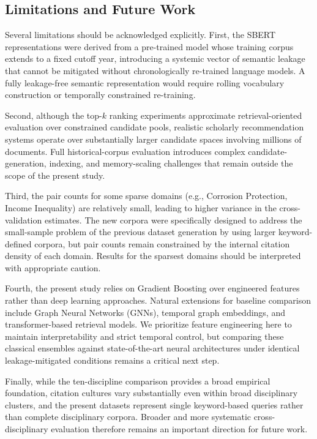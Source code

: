 \documentclass[11pt,a4paper]{article}
\begin{document}
\subsection{Limitations and Future Work}

Several limitations should be acknowledged explicitly. First, the SBERT representations were derived from a pre-trained model whose training corpus extends to a fixed cutoff year, introducing a systemic vector of semantic leakage that cannot be mitigated without chronologically re-trained language models. A fully leakage-free semantic representation would require rolling vocabulary construction or temporally constrained re-training.

Second, although the top-\(k\) ranking experiments approximate retrieval-oriented evaluation over constrained candidate pools, realistic scholarly recommendation systems operate over substantially larger candidate spaces involving millions of documents. Full historical-corpus evaluation introduces complex candidate-generation, indexing, and memory-scaling challenges that remain outside the scope of the present study.

Third, the pair counts for some sparse domains (e.g., Corrosion Protection, Income Inequality) are relatively small, leading to higher variance in the cross-validation estimates. The new corpora were specifically designed to address the small-sample problem of the previous dataset generation by using larger keyword-defined corpora, but pair counts remain constrained by the internal citation density of each domain. Results for the sparsest domains should be interpreted with appropriate caution.

Fourth, the present study relies on Gradient Boosting over engineered features rather than deep learning approaches. Natural extensions for baseline comparison include Graph Neural Networks (GNNs), temporal graph embeddings, and transformer-based retrieval models. We prioritize feature engineering here to maintain interpretability and strict temporal control, but comparing these classical ensembles against state-of-the-art neural architectures under identical leakage-mitigated conditions remains a critical next step.

Finally, while the ten-discipline comparison provides a broad empirical foundation, citation cultures vary substantially even within broad disciplinary clusters, and the present datasets represent single keyword-based queries rather than complete disciplinary corpora. Broader and more systematic cross-disciplinary evaluation therefore remains an important direction for future work.
\end{document}

